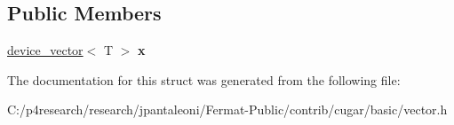 \subsection*{Public Members}
\begin{DoxyCompactItemize}
\item 
\hyperlink{structcugar_1_1device__vector}{device\+\_\+vector}$<$ T $>$ {\bfseries x}
\end{DoxyCompactItemize}


The documentation for this struct was generated from the following file\+:\begin{DoxyCompactItemize}
\item 
C\+:/p4research/research/jpantaleoni/\+Fermat-\/\+Public/contrib/cugar/basic/vector.\+h\end{DoxyCompactItemize}
